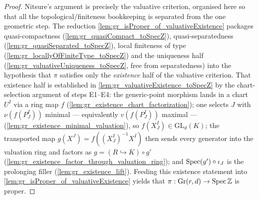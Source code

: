\begin{proof}
  \leanok
  Nitsure's argument is precisely the valuative criterion, organised here so that
  all the topological/finiteness bookkeeping is separated from the one geometric
  step. The reduction \cref{lem:gr_isProper_of_valuativeExistence} packages
  quasi-compactness (\cref{lem:gr_quasiCompact_toSpecZ}), quasi-separatedness
  (\cref{lem:gr_quasiSeparated_toSpecZ}), local finiteness of type
  (\cref{lem:gr_locallyOfFiniteType_toSpecZ}) and the uniqueness half
  (\cref{lem:gr_valuativeUniqueness_toSpecZ}, free from separatedness) into the
  hypothesis that \(\pi\) satisfies only the \emph{existence} half of the valuative
  criterion. That existence half is established in
  \cref{lem:gr_valuativeExistence_toSpecZ} by the chart-selection argument of steps
  E1--E4: the generic-point morphism lands in a chart \(U^I\) via a ring map \(f\)
  (\cref{lem:gr_existence_chart_factorization}); one selects \(J\) with
  \(\nu(f(P^I_J))\) minimal --- equivalently \(v(f(P^I_J))\) maximal ---
  (\cref{lem:gr_existence_minimal_valuation}), so \(f(X^I_J) \in \mathrm{GL}_d(K)\);
  the transported map \(g(X^J) = f((X^I_J)^{-1} X^I)\) then sends every generator
  into the valuation ring and factors as \(g = (R \hookrightarrow K)\circ g'\)
  (\cref{lem:gr_existence_factor_through_valuation_ring}); and \(\operatorname{Spec}(g') \circ
  \iota_J\) is the prolonging filler (\cref{lem:gr_existence_lift}). Feeding this
  existence statement into \cref{lem:gr_isProper_of_valuativeExistence} yields that
  \(\pi : \mathrm{Gr}(r,d) \to \operatorname{Spec} \mathbb{Z}\) is proper.
\end{proof}

